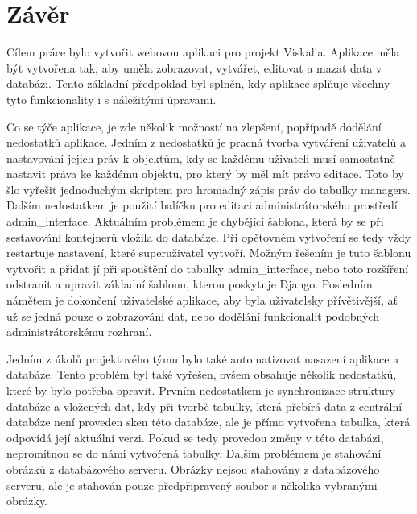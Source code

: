 \chapter*{Závěr}
\label{5-zaver}

Cílem práce bylo vytvořit webovou aplikaci pro projekt
Viskalia. Aplikace měla být vytvořena tak, aby uměla zobrazovat,
vytvářet, editovat a mazat data v databázi. Tento základní předpoklad
byl splněn, kdy aplikace splňuje všechny tyto funkcion\-ality i s
náležitými úpravami.

Co se týče aplikace, je zde několik možností na zlepšení, popřípadě
dodělání nedostatků aplikace. Jedním z nedostatků je pracná tvorba
vytváření uživatelů a nastavování jejich práv k objektům, kdy se
každému uživateli musí samostatně nastavit práva ke každému objektu,
pro který by měl mít právo editace. Toto by šlo vyřešit jednoduchým
skriptem pro hromadný zápis práv do tabulky managers. Dalším
nedostatkem je použití balíčku pro editaci administrátorského
prostředí admin\_interface. Aktuálním problémem je chybějící šablona, která
by se při sestavování kontejnerů vložila do databáze. Při opětovném
vytvoření se tedy vždy restartuje nastavení, které superuživatel
vytvoří. Možným řešením je tuto šablonu vytvořit a přidat jí při
spouštění do tabulky admin\_interface, nebo toto rozšíření odstranit a
upravit základní  šablonu, kterou poskytuje Django. Posledním
námětem je dokončení uživatelské aplikace, aby byla uživatelsky
přívětivější, ať už se jedná pouze o zobrazování dat, nebo dodělání
funkcionalit podobných administrátorskému rozhraní.

Jedním z úkolů projektového týmu  bylo také automatizovat
nasazení aplikace a databáze. Tento problém byl také vyřešen, ovšem
obsahuje několik nedostatků, které by bylo potřeba opravit. Prvním
nedostatkem je synchronizace struktury databáze a vložených dat, kdy
při tvorbě tabulky, která přebírá data z centrální databáze není
proveden sken této databáze, ale je přímo vytvořena tabulka, která
odpovídá její aktuální verzi. Pokud se tedy provedou změny v této
databázi, nepromítnou se do námi vytvořená tabulky. Dalším problémem
je stahování obrázků z databázového serveru. Obrázky nejsou stahovány
z databázového serveru, ale je stahován pouze předpřipravený soubor s
několika vybranými obrázky.
